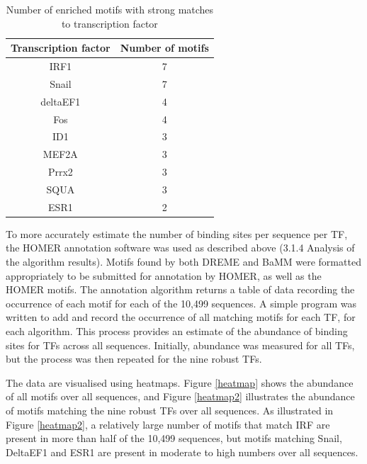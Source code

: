 \documentclass[12pt]{article}
\begin{document}
\begin{table}[!htbp]
\caption{Number of enriched motifs with strong matches to transcription factor}
\label{totalMotifs}
\centering
\begin{tabular}{cc}
\toprule[0.2em]
Transcription factor & Number of motifs\\
\midrule[0.1em]
IRF1             & 7\\
Snail             & 7\\
deltaEF1      & 4\\
Fos           &   4\\
ID1            & 3\\
MEF2A       & 3\\
Prrx2        &  3\\
SQUA       &  3\\
ESR1       &  2\\
\bottomrule[0.2em]
\end{tabular}
\end{table}

To more accurately estimate the number of binding sites per sequence per TF, the HOMER annotation software was used as described above (3.1.4 Analysis of the algorithm results). Motifs found by both DREME and BaMM were formatted appropriately to be submitted for annotation by HOMER, as well as the HOMER motifs. The annotation algorithm returns a table of data recording the occurrence of each motif for each of the 10,499 sequences. A simple program was written to add and record the occurrence of all matching motifs for each TF, for each algorithm. This process provides an estimate of the abundance of binding sites for TFs across all sequences. Initially, abundance was measured for all TFs, but the process was then repeated for the nine robust TFs. 

The  data are visualised using heatmaps. Figure \ref{heatmap} shows the abundance of all motifs over all sequences, and Figure \ref{heatmap2} illustrates the abundance of motifs matching the nine robust TFs over all sequences. As illustrated in Figure \ref{heatmap2}, a relatively large number of motifs that match IRF are present in more than half of the 10,499 sequences, but motifs matching Snail, DeltaEF1 and ESR1 are present in moderate to high numbers over all sequences. 
\end{document}
